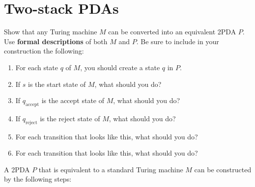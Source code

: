 \documentclass{article}
\begin{document}
    \section{Two-stack PDAs}

    Show that any Turing machine $M$ can be converted into an equivalent 2PDA $P$. Use \textbf{formal descriptions} of both $M$ and $P$. Be sure to include in your construction the following:

    \begin{enumerate}[-]
        \item For each state $q$ of $M$, you should create a state $q$ in $P$.
        
        \item If $s$ is the start state of $M$, what should you do?

        \item If $q_\text{accept}$ is the accept state of $M$, what should you do?

        \item If $q_\text{reject}$ is the reject state of $M$, what should you do?

        \item For each transition that looks like this, what should you do?
            \begin{center}
            \end{center}

        \item For each transition that looks like this, what should you do?
            \begin{center}
            \end{center}
    \end{enumerate}

    A 2PDA $P$ that is equivalent to a standard Turing machine $M$ can be constructed by the following steps:
\end{document}
